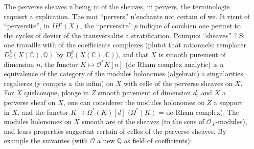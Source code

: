 \documentclass[12pt,a4paper]{article}
\theoremstyle{plain}
\theoremstyle{definition}
\theoremstyle{remark}
\newcommand{\IH}{\mathit{IH}}
\newcommand{\CC}{\mathbb{C}}
\newcommand{\QQ}{\mathbb{Q}}
\newcommand{\cO}{\mathcal{O}}
\begin{document}
The perverse sheaves n'being ni of the sheaves, ni pervers, the terminologie requiert a explication. The mot ``pervers'' n'enchante not certain of we. It vient of ``perversite'', in $\IH^{i}(X)$, the ``perversite'' $p$ indique of combien one permet to the cycles of devier of the transversalite a stratification. Pourquoi ``sheaves'' ? Si one travaille with of the coefficients complexes (plutot that rationnels: remplacer $D^{b}_{c}(X(\CC), \QQ)$ by $D^{b}_{c}(X(\CC), \CC)$), and that $X$ is smooth purement of dimension $n$, the functor $K \mapsto \cO^{*}K[n]$ (de Rham complex analytic) is a equivalence of the category of the modules holonomes (algebraic) a singularities regulieres (y compris a the infini) on $X$ with celle of the perverse sheaves on $X$. For $X$ quelconque, plonge in $Z$ smooth purement of dimension $d$, and $X$ a perverse sheaf on $X$, one can considerer the modules holonomes on $Z$ a support in $X$, and the functor $K \mapsto \Omega^{*}(K)[d]$ ($\Omega^{*}(K)$ = de Rham complex). The modules holonomes on $X$ smooth are of the sheaves (to the sens of $\cO_{X}$-modules), and leurs properties suggerent certain of celles of the perverse sheaves. By example the suivantes (with $\cO$ a new $\QQ$ as field of coefficients):
\end{document}
